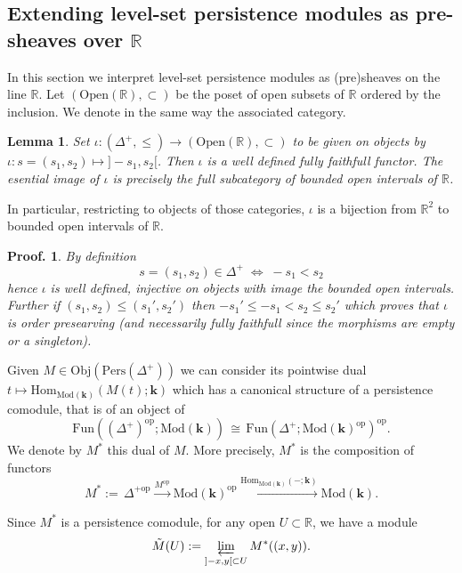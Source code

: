 \documentclass[a4paper, english, 11pt]{article}
\newcommand{\kk}[0]{\textbf{k}}
\newcommand{\Mod}[0]{\text{Mod}}
\newcommand{\Pe}{\text{Pers}}
\newcommand{\0}{\vec{0}}
\newcommand{\R}[0]{\mathbb{R}}
\newcommand{\Obj}[0]{\text{Obj}}
\newcommand{\Ouv}[0]{\mathrm{Open}}
\newcommand{\op}[0]{\text{op}}
\newcommand{\Hom}[0]{\text{Hom}}
\newtheorem*{pf}{Proof.} }
\newtheorem{lem}[prop]{Lemma}
\begin{document}
\subsection{Extending level-set persistence modules as pre-sheaves over $\R$}\label{SS:levelsettopresheaves}
In this section we interpret level-set persistence modules as (pre)sheaves on the line $\R$. 
 Let $(\Ouv(\R), \subset )$ be the poset of open subsets of $\R$ ordered by the inclusion. We denote in the same way the associated category.  
\begin{lem} \label{L:Defiota}Set $\iota: (\Delta^+, \leq)\to (\Ouv(\R), \subset)$ to be given on objects by 
  $\iota: s=(s_1, s_2) \mapsto ]-s_1, s_2[$.%
  Then $\iota$ is a well defined  fully faithfull functor.
  The esential image of $\iota$ is precisely the full subcategory of bounded open intervals of $\R$. 
\end{lem}
In particular, restricting to objects of those categories,  $\iota$ is a bijection from $\R^2$ to bounded open intervals of $\R$. 
\begin{pf}
 By definition  $$ s=(s_1, s_2)\in \Delta^+ \;\Longleftrightarrow \;-s_1<s_2$$ hence $\iota$ is well defined, injective on objects with image the bounded open intervals.  Further if $(s_1, s_2)\leq (s_1', s_2')$ then 
 $-s_1'\leq -s_1<s_2\leq s_2'$ which proves that $\iota$ is order presearving (and necessarily fully faithfull since the morphisms are empty or a singleton). 
\end{pf}



Given $M \in \Obj(\Pe(\Delta^+))$ we can consider its pointwise dual $ t\mapsto \Hom_{\Mod(\kk)}(M(t);\kk)$ which has a canonical structure of a persistence comodule, that is of an object of  
$$\text{Fun}((\Delta^{+})^{\op}; \Mod(\kk))\,\cong\, \text{Fun}(\Delta^+; \Mod(\kk)^{\op})^{\op}. $$  We denote by $M^*$ this dual of $M$. More precisely, $M^*$ is the composition of functors
$$M^* :=\, \Delta^{+\op} \stackrel{M^{\op}}\longrightarrow \Mod(\kk)^{\op} \stackrel{\Hom_{\Mod(\kk)}(-;\kk)}\longrightarrow \Mod(\kk). $$

Since $M^*$ is a persistence comodule, for any  open $U \subset \R$, we have a module 
\begin{equation}\label{eq:defMtilde} 
\Tilde{M} (U):=  \varprojlim_{]-x,y[\subset U} M^*((x,y)).\end{equation}
                                     
\end{document}
